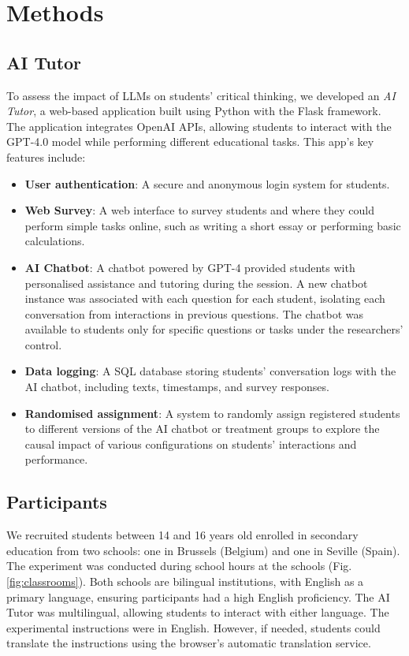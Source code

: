 \documentclass[
  11pt,
]{article}
\providecommand{\tightlist}{%
  \setlength{\itemsep}{0pt}\setlength{\parskip}{0pt}}
\begin{document}
\section{Methods}\label{sec:methods}

\subsection{AI Tutor}\label{ai-tutor}

To assess the impact of LLMs on students' critical thinking, we developed an \emph{AI Tutor}, a web-based application built using Python with the Flask framework. The application integrates OpenAI APIs, allowing students to interact with the GPT-4.0 model while performing different educational tasks. This app's key features include:

\begin{itemize}
\tightlist
\item
  \textbf{User authentication}: A secure and anonymous login system for students.
\item
  \textbf{Web Survey}: A web interface to survey students and where they could perform simple tasks online, such as writing a short essay or performing basic calculations.
\item
  \textbf{AI Chatbot}: A chatbot powered by GPT-4 provided students with personalised assistance and tutoring during the session. A new chatbot instance was associated with each question for each student, isolating each conversation from interactions in previous questions. The chatbot was available to students only for specific questions or tasks under the researchers' control.
\item
  \textbf{Data logging}: A SQL database storing students' conversation logs with the AI chatbot, including texts, timestamps, and survey responses.
\item
  \textbf{Randomised assignment}: A system to randomly assign registered students to different versions of the AI chatbot or treatment groups to explore the causal impact of various configurations on students' interactions and performance.
\end{itemize}

\subsection{Participants}\label{participants}

We recruited students between 14 and 16 years old enrolled in secondary education from two schools: one in Brussels (Belgium) and one in Seville (Spain). The experiment was conducted during school hours at the schools (Fig. \ref{fig:classrooms}). Both schools are bilingual institutions, with English as a primary language, ensuring participants had a high English proficiency. The AI Tutor was multilingual, allowing students to interact with either language. The experimental instructions were in English. However, if needed, students could translate the instructions using the browser's automatic translation service.
\end{document}
